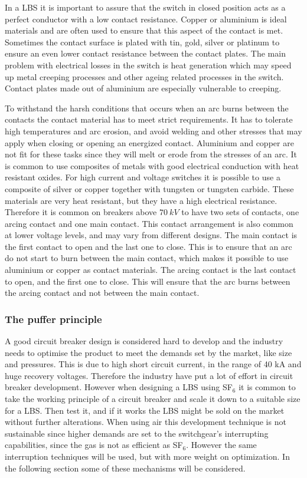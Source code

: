 \documentclass[10pt,a4paper,twoside]{article}
\begin{document}
In a LBS it is important to assure that the switch in closed position acts as a perfect conductor with a low contact resistance. Copper or aluminium is ideal materials and are often used to ensure that this aspect of the contact is met. Sometimes the contact surface is plated with tin, gold, silver or platinum to ensure an even lower contact resistance between the contact plates. The main problem with electrical losses in the switch is heat generation which may speed up metal creeping processes and other ageing related processes in the switch. Contact plates made out of aluminium are especially vulnerable to creeping.
 
To withstand the harsh conditions that occurs when an arc burns between the contacts the contact material has to meet strict requirements. It has to tolerate high temperatures and arc erosion, and avoid welding and other stresses that may apply when closing or opening an energized contact. Aluminium and copper are not fit for these tasks since they will melt or erode from the stresses of an arc. It is common to use composites of metals with good electrical conduction with heat resistant oxides. For high current and voltage switches it is possible to use a composite of silver or copper together with tungsten or tungsten carbide. These materials are very heat resistant, but they have a high electrical resistance. Therefore it is common on breakers above $70 \ kV$ to have two sets of contacts, one arcing contact and one main contact. This contact arrangement is  also common at lower voltage levels, and may vary from different designs. The main contact is the first contact to open and the last one to close. This is to ensure that an arc do not start to burn between the main contact, which makes it possible to use aluminium or copper as contact materials. The arcing contact is the last contact to open, and the first one to close. This will ensure that the arc burns between the arcing contact and not between the main contact.

\subsubsection{The puffer principle}
A good circuit breaker design is considered hard to develop and the industry needs to optimise the product to meet the demands set by the market, like size and pressures. This is due to high short circuit current, in the range of 40 kA and huge recovery voltages. Therefore the industry have put a lot of effort in circuit breaker development. However when designing a LBS using SF$_6$ it is common to take the working principle of a circuit breaker and scale it down to a suitable size for a LBS. Then test it, and if it works the LBS might be sold on the market without further alterations. When using air this development technique is not sustainable since higher demands are set to the switchgear's interrupting capabilities, since the gas is not as efficient as SF$_6$. However the same interruption techniques will be used, but with more weight on optimization. In the following section some of these mechanisms will be considered. 
\end{document}
